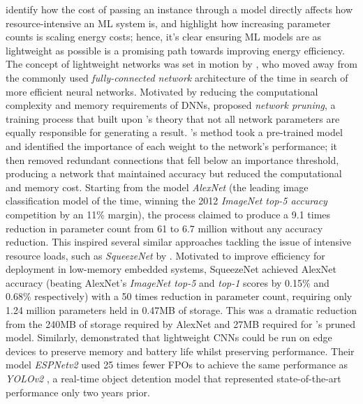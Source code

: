 \documentclass[a4paper, 12pt]{article}
\begin{document}
     identify how the cost of passing an instance through a model directly affects how resource-intensive an ML system is, and  highlight how increasing parameter counts is scaling energy costs; hence, it's clear ensuring ML models are as lightweight as possible is a promising path towards improving energy efficiency. The concept of lightweight networks was set in motion by , who moved away from the commonly used \emph{fully-connected network} architecture of the time in search of more efficient neural networks. Motivated by reducing the computational complexity and memory requirements of DNNs,  proposed \emph{network pruning}, a training process that built upon 's theory that not all network parameters are equally responsible for generating a result. 's method took a pre-trained model and identified the importance of each weight to the network's performance; it then removed redundant connections that fell below an importance threshold, producing a network that maintained accuracy but reduced the computational and memory cost. Starting from the model \emph{AlexNet} (the leading image classification model of the time, winning the 2012 \emph{ImageNet top-5 accuracy} competition by an 11\% margin), the process claimed to produce a 9.1 times reduction in parameter count from 61 to 6.7 million without any accuracy reduction. This inspired several similar approaches tackling the issue of intensive resource loads, such as \emph{SqueezeNet} by . Motivated to improve efficiency for deployment in low-memory embedded systems, SqueezeNet achieved AlexNet accuracy (beating AlexNet's \emph{ImageNet top-5} and \emph{top-1} scores by 0.15\% and 0.68\% respectively) with a 50 times reduction in parameter count, requiring only 1.24 million parameters held in 0.47MB of storage. This was a dramatic reduction from the 240MB of storage required by AlexNet and 27MB required for 's pruned model. Similarly,  demonstrated that lightweight CNNs could be run on edge devices to preserve memory and battery life whilst preserving performance. Their model \emph{ESPNetv2} used 25 times fewer FPOs to achieve the same performance as \emph{YOLOv2} \cite{redmon-2016}, a real-time object detention model that represented state-of-the-art performance only two years prior.
\end{document}
